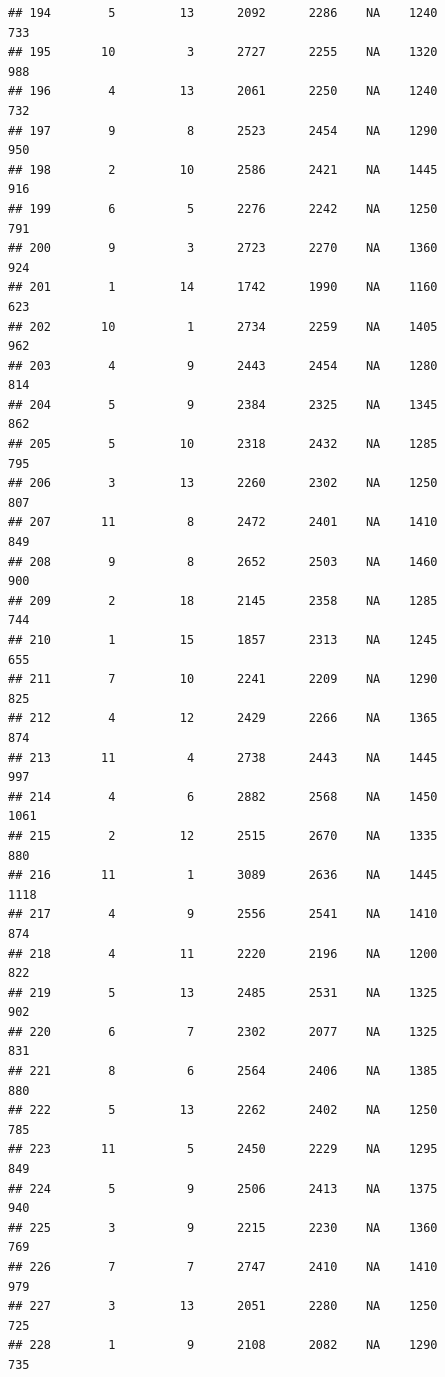 \documentclass[]{book}
\begin{document}
\begin{verbatim}
## 194        5         13      2092      2286    NA    1240            733
## 195       10          3      2727      2255    NA    1320            988
## 196        4         13      2061      2250    NA    1240            732
## 197        9          8      2523      2454    NA    1290            950
## 198        2         10      2586      2421    NA    1445            916
## 199        6          5      2276      2242    NA    1250            791
## 200        9          3      2723      2270    NA    1360            924
## 201        1         14      1742      1990    NA    1160            623
## 202       10          1      2734      2259    NA    1405            962
## 203        4          9      2443      2454    NA    1280            814
## 204        5          9      2384      2325    NA    1345            862
## 205        5         10      2318      2432    NA    1285            795
## 206        3         13      2260      2302    NA    1250            807
## 207       11          8      2472      2401    NA    1410            849
## 208        9          8      2652      2503    NA    1460            900
## 209        2         18      2145      2358    NA    1285            744
## 210        1         15      1857      2313    NA    1245            655
## 211        7         10      2241      2209    NA    1290            825
## 212        4         12      2429      2266    NA    1365            874
## 213       11          4      2738      2443    NA    1445            997
## 214        4          6      2882      2568    NA    1450           1061
## 215        2         12      2515      2670    NA    1335            880
## 216       11          1      3089      2636    NA    1445           1118
## 217        4          9      2556      2541    NA    1410            874
## 218        4         11      2220      2196    NA    1200            822
## 219        5         13      2485      2531    NA    1325            902
## 220        6          7      2302      2077    NA    1325            831
## 221        8          6      2564      2406    NA    1385            880
## 222        5         13      2262      2402    NA    1250            785
## 223       11          5      2450      2229    NA    1295            849
## 224        5          9      2506      2413    NA    1375            940
## 225        3          9      2215      2230    NA    1360            769
## 226        7          7      2747      2410    NA    1410            979
## 227        3         13      2051      2280    NA    1250            725
## 228        1          9      2108      2082    NA    1290            735

\end{verbatim}
\end{document}
